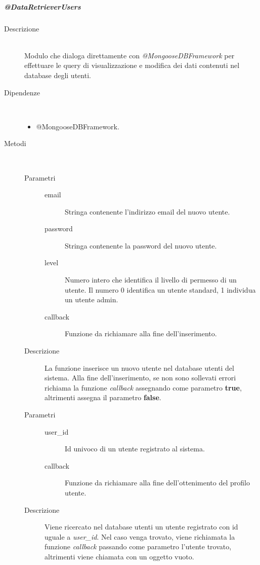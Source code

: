 \subparagraph{@DataRetrieverUsers}
\begin{description}
 \item[Descrizione] \hfill \\
 Modulo che dialoga direttamente con \textit{@MongooseDBFramework} per effettuare le query di visualizzazione e modifica dei dati contenuti nel database degli utenti.
 \item[Dipendenze] \hfill \\
 	\begin{itemize}
 		\item @MongooseDBFramework.
 	\end{itemize}
 \item[Metodi] \hfill \\
 	\begin{mldescription}
 		 \hfill
 			\begin{description}
 				\item[Parametri] \hfill
 					\begin{description}
 						\item[email]
 							Stringa contenente l'indirizzo email del nuovo utente.
 						\item[password]
 							Stringa contenente la password del nuovo utente.
 						\item[level]
 							Numero intero che identifica il livello di permesso di un utente. Il numero 0 								identifica un utente standard, 1 individua un utente admin. 
 						\item[callback]
 							Funzione da richiamare alla fine dell'inserimento.
 					\end{description}
 				\item[Descrizione]
 				La funzione inserisce un nuovo utente nel database utenti del sistema. Alla fine 								dell'inserimento, se non sono sollevati errori richiama la funzione \textit{callback} 						assegnando come parametro \textbf{true}, altrimenti assegna il parametro \textbf{false}.
 			\end{description}
 			
 		 \hfill
 			\begin{description}
 				\item[Parametri] \hfill
 					\begin{description}
 						\item[user\_id]
 							Id univoco di un utente registrato al sistema.
 						\item[callback]
 							Funzione da richiamare alla fine dell'ottenimento del profilo utente.
 					\end{description}
 				\item[Descrizione]
 					Viene ricercato nel database utenti un utente registrato con id uguale a 										\textit{user\_id}. Nel caso venga trovato, viene richiamata la funzione \textit{callback} 					passando come parametro l'utente trovato, altrimenti viene chiamata con un oggetto vuoto.
 			\end{description}
 			

\end{mldescription}
\end{description}
